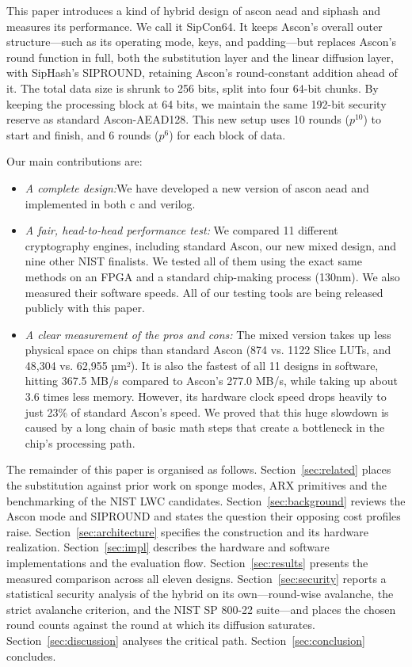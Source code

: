 This paper introduces a kind of hybrid design of ascon aead and siphash and measures its performance. We call it SipCon64. It keeps Ascon's overall outer structure—such as its operating mode, keys, and padding—but replaces Ascon's round function in full, both the substitution layer and the linear diffusion layer, with SipHash's SIPROUND, retaining Ascon's round-constant addition ahead of it. The total data size is shrunk to 256 bits, split into four 64-bit chunks. By keeping the processing block at 64 bits, we maintain the same 192-bit security reserve as standard Ascon-AEAD128. This new setup uses 10 rounds ($p^{10}$) to start and finish, and 6 rounds ($p^{6}$) for each block of data.

Our main contributions are:

\begin{itemize}
\item \emph{A complete design:}We have developed a new version of ascon aead and implemented in both c and verilog.

\item \emph{A fair, head-to-head performance test:} We compared 11 different cryptography engines, including standard Ascon, our new mixed design, and nine other NIST finalists. We tested all of them using the exact same methods on an FPGA and a standard chip-making process (130nm). We also measured their software speeds. All of our testing tools are being released publicly with this paper.
\item \emph{A clear measurement of the pros and cons:} The mixed version takes up less physical space on chips than standard Ascon (874 vs. 1122 Slice LUTs, and 48,304 vs. 62,955 µm²). It is also the fastest of all 11 designs in software, hitting 367.5 MB/s compared to Ascon's 277.0 MB/s, while taking up about 3.6 times less memory. However, its hardware clock speed drops heavily to just 23\% of standard Ascon's speed. We proved that this huge slowdown is caused by a long chain of basic math steps that create a bottleneck in the chip's processing path.
\end{itemize}

The remainder of this paper is organised as follows. Section~\ref{sec:related}
places the substitution against prior work on sponge modes, ARX primitives and
the benchmarking of the NIST LWC candidates. Section~\ref{sec:background}
reviews the Ascon mode and SIPROUND and states the question their opposing
cost profiles raise. Section~\ref{sec:architecture} specifies the
construction and its hardware realization. Section~\ref{sec:impl} describes the hardware and software
implementations and the evaluation flow. Section~\ref{sec:results} presents the
measured comparison across all eleven designs. Section~\ref{sec:security}
reports a statistical security analysis of the hybrid on its own---round-wise
avalanche, the strict avalanche criterion, and the NIST SP 800-22 suite---and
places the chosen round counts against the round at which its diffusion
saturates. Section~\ref{sec:discussion}
analyses the critical path.
Section~\ref{sec:conclusion} concludes.
